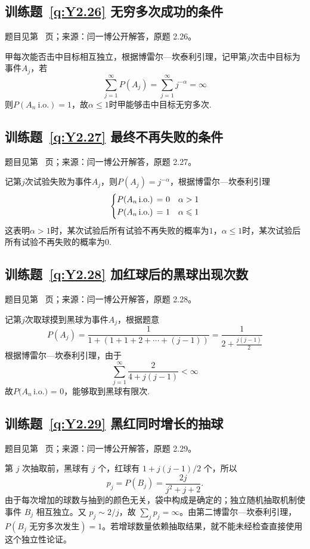 \subsection*{训练题~\ref{q:Y2.26} 无穷多次成功的条件}\label{a:Y2.26}{\small 题目见第~\pageref{q:Y2.26} 页；来源：闫一博公开解答，原题 2.26。}
\begin{solve}
甲每次能否击中目标相互独立，根据博雷尔—坎泰利引理，记甲第$j$次击中目标为事件$A_j$，若
\[\sum\limits_{j = 1}^\infty  {P({A_j})}  = \sum\limits_{j = 1}^\infty  {{j^{ - \alpha }}}  = \infty \]
则$P(A_n\: \text{i.o.})=1$，故$\alpha\leqslant 1$时甲能够击中目标无穷多次.
\end{solve}

\subsection*{训练题~\ref{q:Y2.27} 最终不再失败的条件}\label{a:Y2.27}{\small 题目见第~\pageref{q:Y2.27} 页；来源：闫一博公开解答，原题 2.27。}
\begin{solve}
记第$j$次试验失败为事件$A_j$，则$P(A_j)=j^{-\alpha}$，根据博雷尔—坎泰利引理
\[\left\{ \begin{gathered}
  P({A_n}\,{\text{i}}.{\text{o}}{\text{.) = 0}} \hfill \quad \alpha>1 \\
  P({A_n}\,{\text{i}}.{\text{o}}{\text{.) = 1}} \hfill \quad \alpha\leqslant 1\\ 
\end{gathered}  \right.\]
这表明$\alpha>1$时，某次试验后所有试验不再失败的概率为$1$，$\alpha\leqslant 1$时，某次试验后所有试验不再失败的概率为$0$.
\end{solve}

\subsection*{训练题~\ref{q:Y2.28} 加红球后的黑球出现次数}\label{a:Y2.28}{\small 题目见第~\pageref{q:Y2.28} 页；来源：闫一博公开解答，原题 2.28。}
\begin{solve}
记第$j$次取球摸到黑球为事件$A_j$，根据题意
\[P({A_j}) = \frac{1}{{1 + (1 + 1 + 2 +  \cdots  + (j - 1))}} = \frac{1}{{2 + \frac{{j(j - 1)}}{2}}}\]
根据博雷尔—坎泰利引理，由于
\[\sum\limits_{j = 1}^\infty  {\frac{2}{{4 + j(j - 1)}}}  < \infty \]
故$P({A_n}\,{\text{i}}.{\text{o}}{\text{.) = 0}}$，能够取到黑球有限次.
\end{solve}

\subsection*{训练题~\ref{q:Y2.29} 黑红同时增长的抽球}\label{a:Y2.29}{\small 题目见第~\pageref{q:Y2.29} 页；来源：闫一博公开解答，原题 2.29。}
\begin{solve}第 $j$ 次抽取前，黑球有 $j$ 个，红球有 $1+j(j-1)/2$ 个，所以\[p_j=P(B_j)=\frac{2j}{j^2+j+2}.\]由于每次增加的球数与抽到的颜色无关，袋中构成是确定的；独立随机抽取机制使事件 $B_j$ 相互独立。又 $p_j\sim2/j$，故 $\sum_jp_j=\infty$。由第二博雷尔—坎泰利引理，$P(B_j\text{ 无穷多次发生})=1$。若增球数量依赖抽取结果，就不能未经检查直接使用这个独立性论证。\end{solve}

